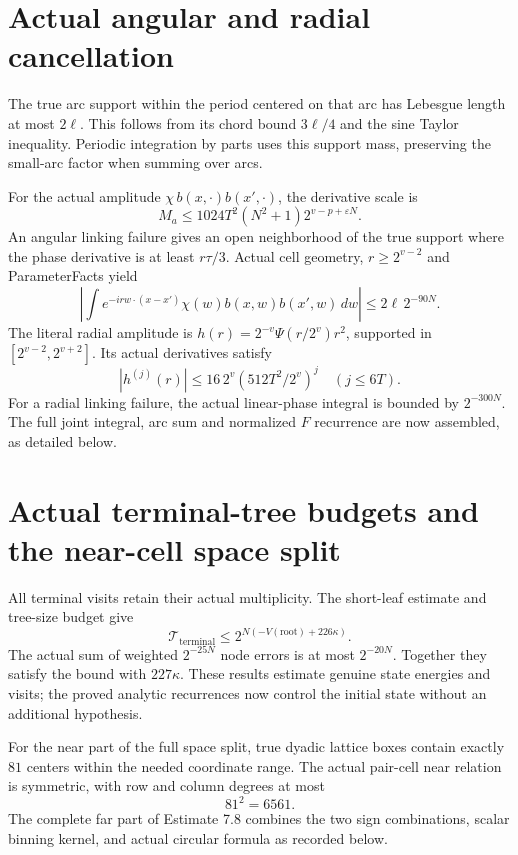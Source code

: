 \documentclass[11pt]{article}
\begin{document}
\newpage
\section*{Actual angular and radial cancellation}
The true arc support within the period centered on that arc has Lebesgue length
at most $2\ell$. This follows from its chord bound $3\ell/4$ and the sine Taylor
inequality. Periodic integration by parts uses this support mass, preserving
the small-arc factor when summing over arcs.

For the actual amplitude $\chi\,b(x,\cdot)b(x',\cdot)$, the derivative scale is
\[
M_a\le1024T^2(N^2+1)2^{v-p+\varepsilon N}.
\]
An angular linking failure gives an open neighborhood of the true support
where the phase derivative is at least $r\tau/3$. Actual cell geometry,
$r\ge2^{v-2}$ and ParameterFacts yield
\[
\left|\int e^{-irw\cdot(x-x')}\chi(w)b(x,w)b(x',w)\,dw\right|
\le2\ell\,2^{-90N}.
\]
The literal radial amplitude is $h(r)=2^{-v}\Psi(r/2^v)r^2$, supported in
$[2^{v-2},2^{v+2}]$. Its actual derivatives satisfy
\[
|h^{(j)}(r)|\le16\,2^v(512T^2/2^v)^j\quad(j\le6T).
\]
For a radial linking failure, the actual linear-phase integral is bounded by
$2^{-300N}$. The full joint integral, arc sum and normalized $F$ recurrence
are now assembled, as detailed below.

\newpage
\section*{Actual terminal-tree budgets and the near-cell space split}
All terminal visits retain their actual multiplicity. The short-leaf estimate
and tree-size budget give
\[
\mathcal T_{\mathrm{terminal}}\le2^{N(-V(\mathrm{root})+226\kappa)}.
\]
The actual sum of weighted $2^{-25N}$ node errors is at most $2^{-20N}$.
Together they satisfy the bound with $227\kappa$. These results estimate genuine
state energies and visits; the proved analytic recurrences now control the
initial state without an additional hypothesis.

For the near part of the full space split, true dyadic lattice boxes contain
exactly $81$ centers within the needed coordinate range. The actual pair-cell
near relation is symmetric, with row and column degrees at most
\[
81^2=6561.
\]
The complete far part of Estimate 7.8 combines the two sign combinations,
scalar binning kernel, and actual circular formula as recorded below.

\newpage
\end{document}
